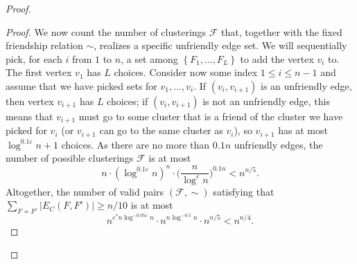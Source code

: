 \documentclass[11pt]{article}
\theoremstyle{definition}
\newcommand{\set}[1]{\left\{ #1 \right\}}
\newcommand{\fset}{{\mathcal{F}}}
\newcommand{\eps}{{\varepsilon}}
\begin{document}
\begin{proof}
\begin{proof}
We now count the number of clusterings $\fset$ that, together with the fixed friendship relation $\sim$, realizes a specific unfriendly edge set.
We will sequentially pick, for each $i$ from $1$ to $n$, a set among $\set{F_1,\ldots,F_L}$ to add the vertex $v_i$ to.
The first vertex $v_1$ has $L$ choices. Consider now some index $1 \le i \le n-1$ and assume that we have picked sets for $v_1,\ldots,v_{i}$. If $(v_i,v_{i+1})$ is an unfriendly edge, then vertex $v_{i+1}$ has $L$ choices; if $(v_i,v_{i+1})$ is not an unfriendly edge, this means that $v_{i+1}$ must go to some cluster that is a friend of the cluster we have picked for $v_{i}$ (or $v_{i+1}$ can go to the same cluster as $v_i$), so $v_{i+1}$ has at most $\log^{0.1\eps} n + 1$ choices.
As there are no more than $0.1n$ unfriendly edges, the number of possible clusterings $\fset$ is at most
$$
n\cdot (\log^{0.1\eps} n)^n \cdot \bigg(\frac{n}{\log^{\eps} n}\bigg)^{0.1n} < n^{n/5}.
$$
Altogether, the number of valid pairs $(\fset,\sim)$ satisfying that $\sum_{F\not\sim F'}|E_{C}(F,F')|\ge n/10$ is at most
$$
n^{c^*n \log^{-0.05\eps} n} \cdot n^{n \log^{-0.5}n} \cdot n^{n/5} < n^{n/4}.
$$
\end{proof}



\end{proof}
\end{document}
